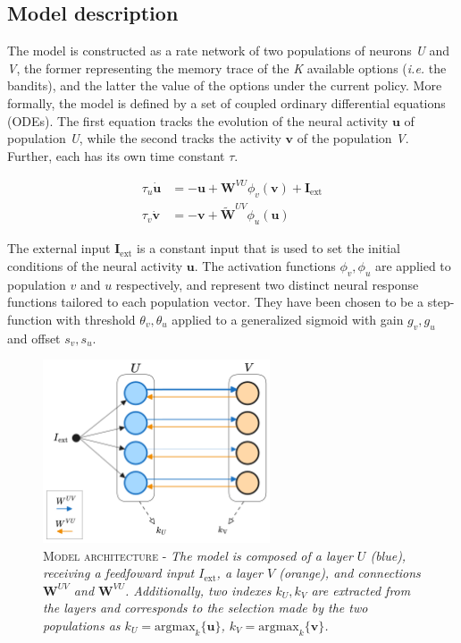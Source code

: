 
\subsection{Model description}
The model is constructed as a rate network of two populations of neurons \textit{U} and \textit{V}, the former representing the memory trace of the \textit{K} available options (\textit{i.e.} the bandits), and the latter the value of the options under the current policy.
More formally, the model is defined by a set of coupled ordinary differential equations (ODEs).
The first equation tracks the evolution of the neural activity $\textbf{u}$ of population \textit{U}, while the second tracks the activity $\textbf{v}$ of the population \textit{V}. Further, each has its own time constant $\tau$.

\begin{equation}
\begin{aligned}
    \tau_{u} \dot{\textbf{u}}&= -\textbf{u} + \textbf{W}^{VU}\phi_{v}(\textbf{v}) + \textbf{I}_{\text{ext}} \\
    \tau_{v} \dot{\textbf{v}}&= -\textbf{v} + \widetilde{\textbf{W}}^{UV}\phi_{u}(\textbf{u})
\end{aligned}
\end{equation}\label{eq:main}

\noindent The external input $\textbf{I}_{\text{ext}}$ is a constant input that is used to set the initial conditions of the neural activity $\textbf{u}$.
The activation functions $\phi_{v},\phi_{u}$ are applied to population $v$ and $u$ respectively, and represent two distinct neural response functions tailored to each population vector.
They have been chosen to be a step-function with threshold $\theta_{v},\theta_{u}$ applied to a generalized sigmoid with gain $g_{v},g_{u}$ and offset $s_{v},s_{u}$.

\begin{figure}[ht]
    \centering
    \includegraphics[width=0.6\textwidth]{figures/minb_architecture.png}
    \caption{\textsc{Model architecture} - \textit{The model is composed of a layer $U$ (blue), receiving a feedfoward input $I_{\text{ext}}$, a layer $V$ (orange), and connections $\textbf{W}^{UV}$ and $\textbf{W}^{VU}$. Additionally, two indexes $k_{U}, k_{V}$  are extracted from the layers and
    corresponds to the selection made by the two populations as $k_{U}=\text{argmax}_{k} \{\textbf{u}\}$, $k_{V}=\text{argmax}_{k} \{\textbf{v}\}$.}}
    \label{fig:main_architecture}
\end{figure}


